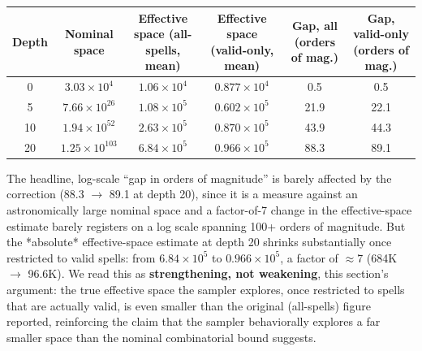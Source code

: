 \documentclass[]{article}
\begin{document}
        \begin{table}[]
            \centering
            \begin{tabularx}{\linewidth}{C C C C C C}
                \hline
                Depth & Nominal space & Effective space (all-spells, mean) & Effective space (valid-only, mean) & Gap, all (orders of mag.) & Gap, valid-only (orders of mag.) \\
                  & $3.03 \times 10^4$   & $1.06 \times 10^4$ & $0.877 \times 10^4$ & 0.5  & 0.5  \\
                5  & $7.66 \times 10^{26}$  & $1.08 \times 10^5$ & $0.602 \times 10^5$ & 21.9 & 22.1 \\
                10 & $1.94 \times 10^{52}$  & $2.63 \times 10^5$ & $0.870 \times 10^5$ & 43.9 & 44.3 \\
                20 & $1.25 \times 10^{103}$ & $6.84 \times 10^5$ & $0.966 \times 10^5$ & 88.3 & 89.1 \\
                \hline
            \end{tabularx}
            \label{tab:nominal-effective-space-valid-only}
        \end{table}
        
        The headline, log-scale ``gap in orders of magnitude'' is barely affected by the correction (88.3 $\to$ 89.1 at depth 20), since it is a measure against an astronomically large nominal space and a factor-of-7 change in the effective-space estimate barely registers on a log scale spanning 100+ orders of magnitude. But the *absolute* effective-space estimate at depth 20 shrinks substantially once restricted to valid spells: from $6.84 \times 10^5$ to $0.966 \times 10^5$, a factor of $\approx$7 (684K $\to$ 96.6K). We read this as \textbf{strengthening, not weakening}, this section's argument: the true effective space the sampler explores, once restricted to spells that are actually valid, is even smaller than the original (all-spells) figure reported, reinforcing the claim that the sampler behaviorally explores a far smaller space than the nominal combinatorial bound suggests.
        
\end{document}
